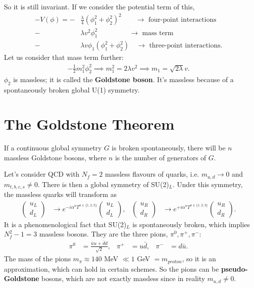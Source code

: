 \documentclass[a4paper, 11pt, normalem]{report}
\begin{document}
So it is still invariant.
If we consider the potential term of this,
\begin{equation}
    \begin{split}
        -V(\phi) = -&\frac{\lambda}{4}(\phi_1^2+\phi_2^2)^2 \quad\quad\to\text{ four-point interactions} \\
                   -& \lambda v^2\phi_1^2 \;\;\quad\quad\quad\quad\to\text{ mass term} \\
                   -& \lambda v\phi_1(\phi_1^2+\phi_2^2) \quad\to\text{ three-point interactions}.
    \end{split}
\end{equation}
Let us consider that mass term further:
\begin{align}
    -\frac12 m_1^2\phi_2^2 \implies m_1^2 = 2\lambda v^2 \implies m_1 = \sqrt{2\lambda}v.
\end{align}
$\phi_2$ is massless; it is called the \textbf{Goldstone boson}.
It's massless because of a spontaneously broken global U(1) symmetry.

\section{The Goldstone Theorem}
If a continuous global symmetry $G$ is broken spontaneously, there will be $n$ massless Goldstone bosons, where $n$ is the number of generators of $G$.

Let's consider QCD with $N_f=2$ massless flavours of quarks, i.e. $m_{u,d}\to0$ and $m_{t,b,c,s}\neq0$.
There is then a global symmetry of SU(2)$_L$.
Under this symmetry, the massless quarks will transform as
\begin{align}
    \begin{pmatrix} u_L \\ d_L\end{pmatrix} &\to e^{-i\alpha^aT^{a\in\{1,2,3\}}}\begin{pmatrix}u_L\\ d_L\end{pmatrix}, & \begin{pmatrix} u_R \\ d_R\end{pmatrix} &\to e^{+i\alpha^aT^{a\in\{1,2,3\}}}\begin{pmatrix}u_R\\ d_R\end{pmatrix}.
\end{align}
It is a phenomenological fact that SU(2)$_L$ is spontaneously broken, which implies $N_f^2-1=3$ massless bosons.
They are the three pions, $\pi^0,\pi^+,\pi^-$:
\begin{align}
    \pi^0 &= \frac{\bar{u}u + \bar{d}d}{\sqrt{2}}, & \pi^+ &= u\bar{d}, & \pi^- &= d\bar{u}.
\end{align}
The mass of the pions $m_\pi \approx 140$ MeV $\ll 1$ GeV $= m_{proton}$, so it is an approximation, which can hold in certain schemes.
So the pions can be \textbf{pseudo-Goldstone} bosons, which are not exactly massless since in reality $m_{u,d}\neq0$.
\end{document}
